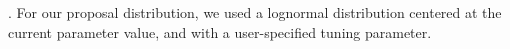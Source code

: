 .  For our proposal distribution, we used a lognormal distribution centered at the current
parameter value, and with a user-specified tuning parameter.

